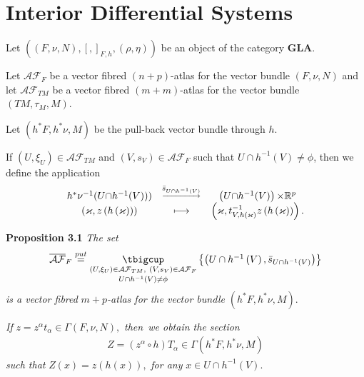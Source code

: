 \documentclass[11pt]{article}
\begin{document}
\section{Interior Differential Systems}

Let $\left( \left( F,\nu ,N\right) ,\left[ ,\right] _{F,h},\left( \rho ,\eta
\right) \right) $ be an object of the category $\mathbf{GLA}$.

Let $\mathcal{AF}_{F}$ be a vector fibred $\left( n+p\right) $-atlas for the
vector bundle $\left( F,\nu ,N\right) $ and let $\mathcal{AF}_{TM}$ be a
vector fibred $\left( m+m\right) $-atlas for the vector bundle $\left(
TM,\tau _{M},M\right) $.

Let $\left( h^{\ast }F,h^{\ast }\nu ,M\right) $ be the pull-back vector
bundle through $h.$

If $\left( U,\xi _{U}\right) \in \mathcal{AF}_{TM}$ and $\left(
V,s_{V}\right) \in \mathcal{AF}_{F}$ such that $U\cap h^{-1}\left( V\right)
\neq \phi $, then we define the application%
\begin{equation*}
\begin{array}{ccc}
h^{\ast }\nu ^{-1}(U{\cap }h^{-1}(V))) & {}^{\underrightarrow{\bar{s}_{U{%
\cap }h^{-1}(V)}}} & \left( U{\cap }h^{-1}(V)\right) {\times }\mathbb{R}^{p}
\\
\left( \varkappa ,z\left( h\left( \varkappa \right) \right) \right) &
\longmapsto & \left( \varkappa ,t_{V,h\left( \varkappa \right) }^{-1}z\left(
h\left( \varkappa \right) \right) \right).%
\end{array}%
\end{equation*}

\textbf{Proposition 3.1 }\emph{The set}%
\begin{equation*}
\begin{array}{c}
\overline{\mathcal{AF}}_{F}\overset{put}{=}\underset{U\cap h^{-1}\left(
V\right) \neq \phi }{\underset{\left( U,\xi _{U}\right) \in \mathcal{AF}%
_{TM},~\left( V,s_{V}\right) \in \mathcal{AF}_{F}}{\tbigcup }}\left\{ \left(
U\cap h^{-1}\left( V\right) ,\bar{s}_{U{\cap }h^{-1}(V)}\right) \right\}%
\end{array}%
\end{equation*}%
\emph{is a vector fibred }$m+p$\emph{-atlas for the vector bundle }$\left(
h^{\ast }F,h^{\ast }\nu ,M\right) .$

\emph{If }$z=z^{\alpha }t_{\alpha }\in \Gamma \left( F,\nu ,N\right) ,$
\emph{then\ we obtain the section }%
\begin{equation*}
\begin{array}{c}
Z=\left( z^{\alpha }\circ h\right) T_{\alpha }\in \Gamma \left( h^{\ast
}F,h^{\ast }\nu ,M\right)%
\end{array}%
\end{equation*}%
\emph{such that }$Z\left( x\right) =z\left( h\left( x\right) \right) ,$
\emph{for any }$x\in U\cap h^{-1}\left( V\right) .$\bigskip
\end{document}
